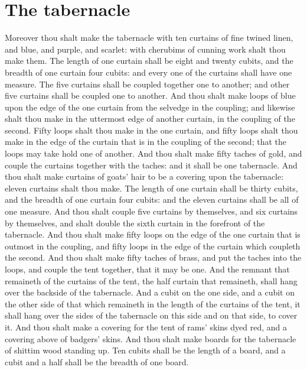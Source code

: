\section*{The tabernacle}
\begin{biblechapter} %
\verse Moreover thou shalt make the tabernacle with ten curtains of fine twined linen, and blue, and purple, and scarlet: with cherubims of cunning work shalt thou make them.
\verse The length of one curtain shall be eight and twenty cubits, and the breadth of one curtain four cubits: and every one of the curtains shall have one measure.
\verse The five curtains shall be coupled together one to another; and other five curtains shall be coupled one to another.
\verse And thou shalt make loops of blue upon the edge of the one curtain from the selvedge in the coupling; and likewise shalt thou make in the uttermost edge of another curtain, in the coupling of the second.
\verse Fifty loops shalt thou make in the one curtain, and fifty loops shalt thou make in the edge of the curtain that is in the coupling of the second; that the loops may take hold one of another.
\verse And thou shalt make fifty taches of gold, and couple the curtains together with the taches: and it shall be one tabernacle.
\verse And thou shalt make curtains of goats' hair to be a covering upon the tabernacle: eleven curtains shalt thou make.
\verse The length of one curtain shall be thirty cubits, and the breadth of one curtain four cubits: and the eleven curtains shall be all of one measure.
\verse And thou shalt couple five curtains by themselves, and six curtains by themselves, and shalt double the sixth curtain in the forefront of the tabernacle.
\verse And thou shalt make fifty loops on the edge of the one curtain that is outmost in the coupling, and fifty loops in the edge of the curtain which coupleth the second.
\verse And thou shalt make fifty taches of brass, and put the taches into the loops, and couple the tent together, that it may be one.
\verse And the remnant that remaineth of the curtains of the tent, the half curtain that remaineth, shall hang over the backside of the tabernacle.
\verse And a cubit on the one side, and a cubit on the other side of that which remaineth in the length of the curtains of the tent, it shall hang over the sides of the tabernacle on this side and on that side, to cover it.
\verse And thou shalt make a covering for the tent of rams' skins dyed red, and a covering above of badgers' skins.
\verse And thou shalt make boards for the tabernacle of shittim wood standing up.
\verse Ten cubits shall be the length of a board, and a cubit and a half shall be the breadth of one board.

\end{biblechapter}
